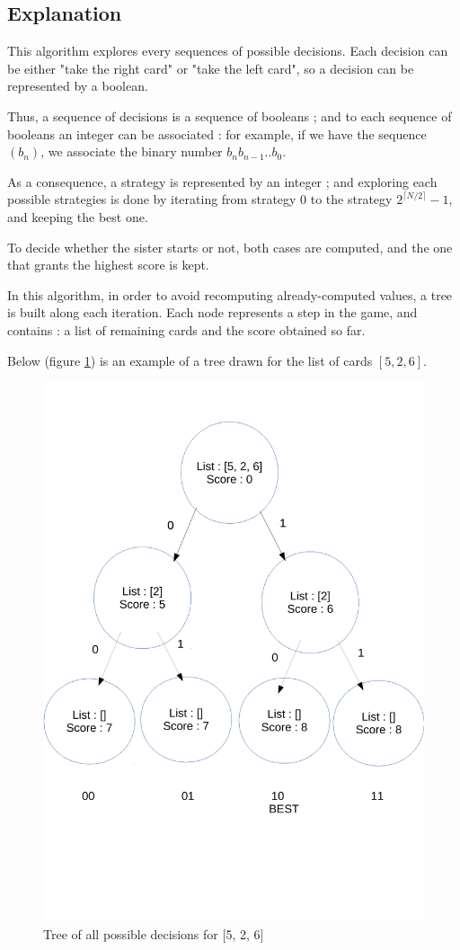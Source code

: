 \documentclass[11pt]{article}
\begin{document}
\subsection{Explanation}
This algorithm explores every sequences of possible decisions. Each decision can
be either "take the right card" or "take the left card", so a decision can be
represented by a boolean.

Thus, a sequence of decisions is a sequence of booleans ; and to each sequence 
of booleans an integer can be associated : for example, if we have the sequence
$(b_n)$, we associate the binary number $b_nb_{n-1}..b_0$.

As a consequence, a strategy is represented by an integer ; and
exploring each possible strategies is done by iterating from strategy 0 to the
strategy $2^{\lceil{N/2}\rceil} - 1$, and keeping the best one.

To decide whether the sister starts or not, both cases are computed, and
the one that grants the highest score is kept.

In this algorithm, in order to avoid recomputing already-computed values,
a tree is built along each iteration. Each node represents a step in the game,
and contains : a list of remaining cards and the score obtained so far.

Below (figure \ref{tree}) is an example of a tree drawn 
for the list of cards $[5, 2, 6]$.
\begin{figure}[ht]
	\center
	\label{tree}
	\includegraphics[width=0.32\linewidth]{complete_space.pdf}
	\caption{Tree of all possible decisions for [5, 2, 6]}
\end{figure}
\end{document}
